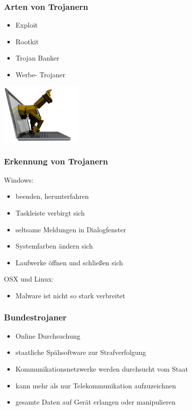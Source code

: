 \documentclass{beamer}
\begin{document}
\begin{frame}
	\frametitle{Arten von Trojanern}
	\begin{itemize}
		\item Exploit
		\item Rootkit
		\item Trojan Banker
		\item Werbe- Trojaner
	\end{itemize}
	\flushright
	\includegraphics[width= 4cm]{bilder/trojaner.jpg}
\end{frame}

\begin{frame}
	\frametitle{Erkennung von Trojanern}
	Windows:
	\begin{itemize}
		\item beenden, herunterfahren
		\item Taskleiste verbirgt sich
		\item seltsame Meldungen in Dialogfenster
		\item Systemfarben ändern sich
		\item Laufwerke öffnen und schließen sich
	\end{itemize}
	OSX und Linux:
	\begin{itemize}
		\item Malware ist nicht so stark verbreitet
	\end{itemize}
\end{frame}


\begin{frame}
	\frametitle{Bundestrojaner}
	\begin{itemize}
		\item Online Durchsuchung
		\item staatliche Spähsoftware zur Strafverfolgung
		\item Kommunikationsnetzwerke werden durchsucht vom Staat
		\item kann mehr als nur Telekommunikation aufzuzeichnen
		\item gesamte Daten auf Gerät erlangen oder manipulieren
	\end{itemize}
\end{frame}
\end{document}
